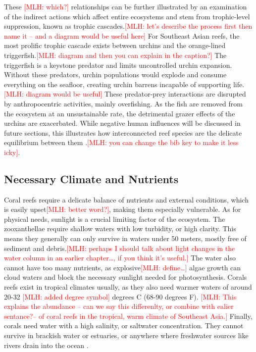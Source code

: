 \documentclass{book}\usepackage{knitr}
\newcommand{\red}[1]{\textcolor{red}{[MLH: #1]}}
\begin{document}
\begin{knitrout}
\begin{kframe}
{These \red{which?} relationships can be further illustrated by an examination of the indirect actions which affect entire ecosystems and stem from trophic-level suppression, known as trophic cascades.\red{let's describe the process first then name it -- and a diagram would be useful here} For Southeast Asian reefs, the most prolific trophic cascade exists between urchins and the orange-lined triggerfish.\red{diagram and then you can explain in the caption?} The triggerfish is a keystone predator and limits uncontrolled urchin expansion. Without these predators, urchin populations would explode and consume everything on the seafloor, creating urchin barrens incapable of supporting life.\red{diagram would be useful} These predator-prey interactions are disrupted by anthropocentric activities, mainly overfishing. As the fish are removed from the ecosystem at an unsustainable rate, the detrimental grazer effects of the urchins are exacerbated. While negative human influences will be discussed in future sections, this illustrates how interconnected reef species are the delicate equilibrium between them \citep{https://doi.org/10.1890/15-1492.1}.\red{you can change the bib key to make it less icky}.

\subsection{Necessary Climate and Nutrients}

Coral reefs require a delicate balance of nutrients and external conditions, which is easily upset\red{better word?}, making them especially vulnerable. As for physical needs, sunlight is a crucial limiting factor of the ecosystem. The zooxanthellae require shallow waters with low turbidity, or high clarity. This means they generally can only survive in waters under 50 meters, mostly free of sediment and debris.\red{perhaps I should talk about light changes in the water column in an earlier chapter\ldots, if you think it's useful.} The water also cannot have too many nutrients, as explosive\red{define\ldots} algae growth can cloud waters and block the necessary sunlight needed for photosynthesis. Corals reefs exist in tropical climates usually, as they also need warmer waters of around 20-32 \degree \red{added degree symbol} degrees C (68-90 degrees F). \red{This explains the abundance -- can we say this differenlty, or combine with ealier sentance?-- of coral reefs in the tropical, warm climate of Southeast Asia.} Finally, corals need water with a high salinity, or saltwater concentration. They cannot survive in brackish water or estuaries, or anywhere where freshwater sources like rivers drain into the ocean \citep{https://doi.org/10.1002/fee.2088}.

}
\end{kframe}
\end{knitrout}
\end{document}
